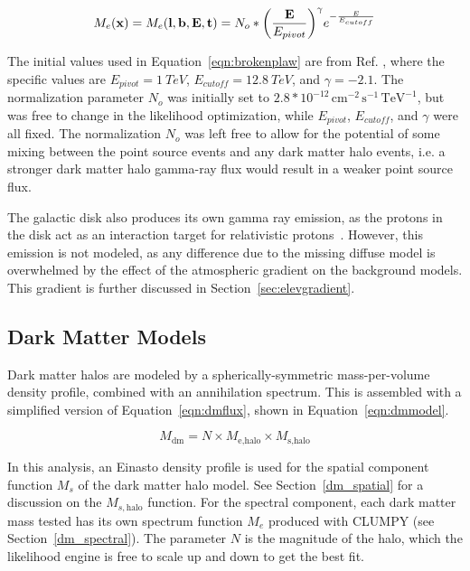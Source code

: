   \begin{equation}\label{eqn:brokenplaw}
    M_e(\mathbf{x }) = M_e(\mathbf{l },\mathbf{b },\mathbf{E },\mathbf{t }) = N_o * { \left ( \frac{\mathbf{E }}{E_{pivot}} \right ) }^{\gamma} {e}^{-\frac{E}{E_{cutoff}}}
  \end{equation}
  
  The initial values used in Equation~\ref{eqn:brokenplaw} are from Ref. \cite{VeritasGCRidge2015}, where the specific values are $E_{pivot}=\SI{1}{TeV}$, $E_{cutoff}=\SI{12.8}{TeV}$, and $\gamma=-2.1$.
  The normalization parameter $N_o$ was initially set to $2.8*{10}^{-12}\,\text{cm}^{-2}\,\text{s}^{-1}\,\text{TeV}^{-1}$, but was free to change in the likelihood optimization, while $E_{pivot}$, $E_{cutoff}$, and $\gamma$ were all fixed.
  The normalization $N_o$ was left free to allow for the potential of some mixing between the point source events and any dark matter halo events, i.e. a stronger dark matter halo gamma-ray flux would result in a weaker point source flux.
  
  The galactic disk also produces its own gamma ray emission, as the protons in the disk act as an interaction target for relativistic protons~\cite{tevgev_gc_diffuse}.
  However, this emission is not modeled, as any difference due to the missing diffuse model is overwhelmed by the effect of the atmospheric gradient on the background models.
  This gradient is further discussed in Section~\ref{sec:elevgradient}.
  
  \subsection{Dark Matter Models}\label{subsec:dmhalomodel}
  Dark matter halos are modeled by a spherically-symmetric mass-per-volume density profile, combined with an annihilation spectrum.
  This is assembled with a simplified version of Equation~\ref{eqn:dmflux}, shown in Equation~\ref{eqn:dmmodel}.
  
  \begin{equation}\label{eqn:dmmodel}
    M_{\textrm{dm}} = N \times M_{\textrm{e,halo}} \times M_{\textrm{s,halo}}
  \end{equation}
  
  In this analysis, an Einasto density profile is used for the spatial component function $M_s$ of the dark matter halo model.
  See Section~\ref{dm_spatial} for a discussion on the $M_{s,\textrm{halo}}$ function.
  For the spectral component, each dark matter mass tested has its own spectrum function $M_e$ produced with CLUMPY (see Section~\ref{dm_spectral}).
  The parameter $N$ is the magnitude of the halo, which the likelihood engine is free to scale up and down to get the best fit.

